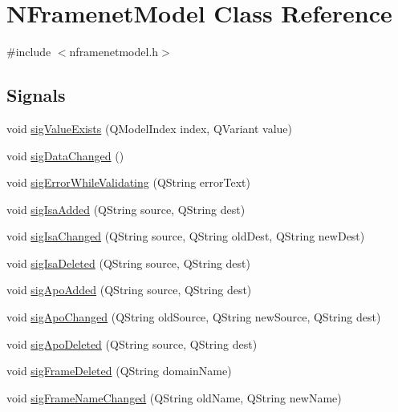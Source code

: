 \hypertarget{class_n_framenet_model}{
\section{NFramenetModel Class Reference}
\label{class_n_framenet_model}
}


{\ttfamily \#include $<$nframenetmodel.h$>$}

\subsection*{Signals}
\begin{DoxyCompactItemize}
\item 
void \hyperlink{class_n_framenet_model_a963afae706f70aca01bedd4d7a9ce1d6}{sigValueExists} (QModelIndex index, QVariant value)
\item 
void \hyperlink{class_n_framenet_model_a78c1d3a344d7f68f712ca592c88a8e24}{sigDataChanged} ()
\item 
void \hyperlink{class_n_framenet_model_a52e862eebbad7960f727c76b151c11ff}{sigErrorWhileValidating} (QString errorText)
\item 
void \hyperlink{class_n_framenet_model_a4c81756690408fbad5f8b7d953f38c30}{sigIsaAdded} (QString source, QString dest)
\item 
void \hyperlink{class_n_framenet_model_a37102d954fe67cb1cb2596fcf4b85770}{sigIsaChanged} (QString source, QString oldDest, QString newDest)
\item 
void \hyperlink{class_n_framenet_model_ae860f11063feddca5c9ba283a2c64438}{sigIsaDeleted} (QString source, QString dest)
\item 
void \hyperlink{class_n_framenet_model_ae4ae207b4e997cb6f91c7d9668c49a1c}{sigApoAdded} (QString source, QString dest)
\item 
void \hyperlink{class_n_framenet_model_a08a2ec63b70b30d816f4dff1ff610a24}{sigApoChanged} (QString oldSource, QString newSource, QString dest)
\item 
void \hyperlink{class_n_framenet_model_a55fc5874a2428837a360981e759aab9f}{sigApoDeleted} (QString source, QString dest)
\item 
void \hyperlink{class_n_framenet_model_a09522d465e22f2cccce9d2a1a1486835}{sigFrameDeleted} (QString domainName)
\item 
void \hyperlink{class_n_framenet_model_af1b36194bd643652b53ed479d8806aa1}{sigFrameNameChanged} (QString oldName, QString newName)
\end{DoxyCompactItemize}
